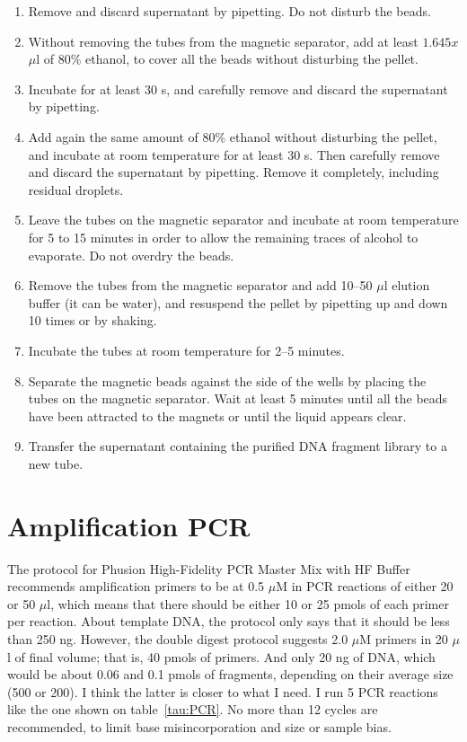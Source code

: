 \documentclass[a4paper,12pt]{article}
\begin{document}
\begin{enumerate}
\item Remove and discard supernatant by pipetting. Do not disturb the beads.
\item Without removing the tubes from the magnetic separator, add at least $1.645x$ $\mu$l of 80\% ethanol, to cover all the beads without disturbing the pellet.
\item Incubate for at least 30 s, and carefully remove and discard the supernatant by pipetting.
\item Add again the same amount of 80\% ethanol without disturbing the pellet, and incubate at room temperature for at least 30 s. Then carefully remove and discard the supernatant by pipetting. Remove it completely, including residual droplets.
\item Leave the tubes on the magnetic separator and incubate at room temperature for 5 to 15 minutes in order to allow the remaining traces of alcohol to evaporate. Do not overdry the beads.
\item Remove the tubes from the magnetic separator and add 10--50 $\mu$l elution buffer (it can be water), and resuspend the pellet by pipetting up and down 10 times or by shaking.
\item Incubate the tubes at room temperature for 2--5 minutes.
\item Separate the magnetic beads against the side of the wells by placing the tubes on the magnetic separator. Wait at least 5 minutes until all the beads have been attracted to the magnets or until the liquid appears clear.
\item Transfer the supernatant containing the purified DNA fragment library to a new tube.
\end{enumerate}

\section{Amplification PCR}
The protocol for Phusion High-Fidelity PCR Master Mix with HF Buffer recommends amplification primers to be at 0.5 $\mu$M in PCR reactions of either 20 or 50 $\mu$l, which means that there should be either 10 or 25 pmols of each primer per reaction. About template DNA, the protocol only says that it should be less than 250 ng. However, the double digest protocol \cite{Peterson2012} suggests 2.0 $\mu$M primers in 20 $\mu$l of final volume; that is, 40 pmols of primers. And only 20 ng of DNA, which would be about 0.06 and 0.1 pmols of fragments, depending on their average size (500 or 200). I think the latter is closer to what I need. I run 5 PCR reactions like the one shown on table~\ref{tau:PCR}. No more than 12 cycles are recommended, to limit base misincorporation and size or sample bias.
\end{document}
